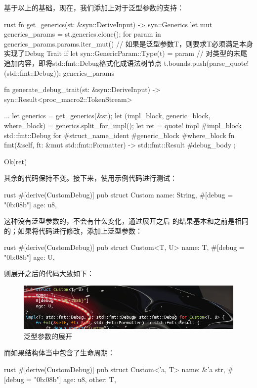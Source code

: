 基于以上的基础，现在，我们添加上对于泛型参数的支持：
\begin{code-block}{rust}
fn get_generics(st: &syn::DeriveInput) -> syn::Generics {
    let mut generics_params = st.generics.clone();
    for param in generics_params.params.iter_mut() {
        // 如果是泛型参数T，则要求T必须满足本身实现了Debug Trait
        if let syn::GenericParam::Type(t) = param {
            // 对类型的末尾追加内容，即将std::fmt::Debug格式化成语法树节点
            t.bounds.push(parse_quote!(std::fmt::Debug));
        }
    }
    generics_params
}

fn generate_debug_trait(st: &syn::DeriveInput) -> syn::Result<proc_macro2::TokenStream> {
    ...
    let generics = get_generics(&st);
    let (impl_block, generic_block, where_block) = generics.split_for_impl();
    let ret = quote! {
        impl #impl_block std::fmt::Debug for #struct_name_ident #generic_block #where_block {
            fn fmt(&self, ft: &mut std::fmt::Formatter) -> std::fmt::Result {
                #debug_body
            }
        }
    };

    Ok(ret)
}
\end{code-block}
其余的代码保持不变。接下来，使用示例代码进行测试：
\begin{code-block}{rust}
#[derive(CustomDebug)]
pub struct Custom {
    name: String,
    #[debug = "0b{:08b}"]
    age: u8,
}
\end{code-block}
这种没有泛型参数的，不会有什么变化，通过展开之后
的结果基本和之前是相同的；如果将代码进行修改，添加上泛型参数：
\begin{code-block}{rust}
#[derive(CustomDebug)]
pub struct Custom<T, U> {
    name: T,
    #[debug = "0b{:08b}"]
    age: U,
}
\end{code-block}
则展开之后的代码大致如下：
\begin{figure}[H]
  \centering
  \includegraphics[width=\linewidth]{rust_with_generic.png}
  \caption{泛型参数的展开}
  \label{fig:rust_with_generic}
\end{figure}
而如果结构体当中包含了生命周期：
\begin{code-block}{rust}
#[derive(CustomDebug)]
pub struct Custom<'a, T> {
    name: &'a str,
    #[debug = "0b{:08b}"]
    age: u8,
    other: T,
}
\end{code-block}
